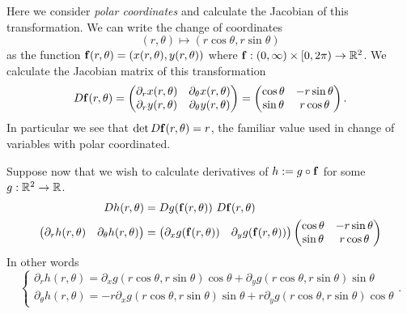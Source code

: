 \begin{example}
    Here we consider \emph{polar coordinates} and calculate the Jacobian of this transformation.
    We can write the change of coordinates
    \[
        (r,\theta) \mapsto (r\cos \theta, r\sin \theta)
    \]
    as the function  \(\mathbf{f}(r,\theta) = (x(r,\theta),y(r,\theta))\) where \(\mathbf{f}:(0,\infty)\times [0,2\pi) \to \mathbb{R}^2\).
    We calculate the Jacobian matrix of this transformation
    \[
        D\mathbf{f}(r,\theta) =
        \begin{pmatrix}
            \partial_{r}x(r,\theta) & \partial_{\theta}x(r,\theta) \\
            \partial_{r}y(r,\theta) & \partial_{\theta}y(r,\theta)
        \end{pmatrix}
        =
        \begin{pmatrix}
            \cos \theta & -r\sin \theta \\
            \sin \theta & r\cos \theta
        \end{pmatrix}.
    \]
    In particular we see that \(\det D\mathbf{f}(r,\theta) = r\), the familiar value used in change of variables with polar coordinated.

    Suppose now that we wish to calculate derivatives of \(h := g \circ \mathbf{f}\) for some  \(g:\mathbb{R}^2 \to \mathbb{R}\).
    \[
        \begin{aligned}
            Dh(r,\theta) & = Dg(\mathbf{f}(r,\theta)) \ D\mathbf{f}(r,\theta) \\
            \begin{pmatrix}
                \partial_r h(r,\theta) & \partial_\theta h(r,\theta)
            \end{pmatrix}
                         & =
            \begin{pmatrix}
                \partial_x g(\mathbf{f}(r,\theta)) & \partial_y g(\mathbf{f}(r,\theta))
            \end{pmatrix}
            \begin{pmatrix}
                \cos \theta & -r\sin \theta \\
                \sin \theta & r\cos \theta
            \end{pmatrix}
        \end{aligned}
    \]
    In other words
    \[
        \begin{cases}
            \partial_r h(r,\theta) = \partial_x g(r\cos \theta, r\sin \theta) \cos \theta + \partial_y g(r\cos \theta, r\sin \theta)\sin \theta \\
            \partial_\theta h(r,\theta) = - r \partial_x g(r\cos \theta, r\sin \theta) \sin \theta +  r \partial_y g(r\cos \theta, r\sin \theta)\cos \theta
        \end{cases}.
    \]
\end{example}






